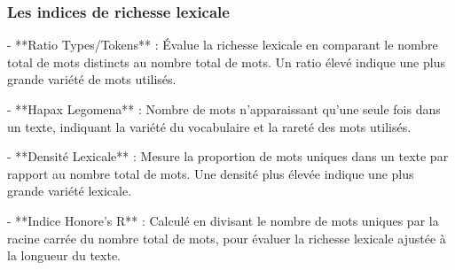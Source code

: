 \documentclass[12pt,a4paper,oneside,titlepage]{article} %
\begin{document}
	\subsubsection{Les indices de richesse lexicale}
	
	- **Ratio Types/Tokens** : Évalue la richesse lexicale en comparant le nombre total de mots distincts au nombre total de mots. Un ratio élevé indique une plus grande variété de mots utilisés.

- **Hapax Legomena** : Nombre de mots n'apparaissant qu'une seule fois dans un texte, indiquant la variété du vocabulaire et la rareté des mots utilisés.

- **Densité Lexicale** : Mesure la proportion de mots uniques dans un texte par rapport au nombre total de mots. Une densité plus élevée indique une plus grande variété lexicale.

- **Indice Honore's R** : Calculé en divisant le nombre de mots uniques par la racine carrée du nombre total de mots, pour évaluer la richesse lexicale ajustée à la longueur du texte.

			\pagebreak
	\printbibliography
\end{document}
